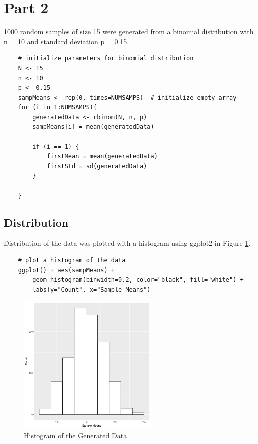 \documentclass{article}
\begin{document}
    \section{Part 2}
        1000 random samples of size 15 were generated from a binomial distribution with n = 10 and standard deviation p = 0.15.

\begin{lstlisting}
    # initialize parameters for binomial distribution
    N <- 15
    n <- 10
    p <- 0.15
    sampMeans <- rep(0, times=NUMSAMPS)  # initialize empty array
    for (i in 1:NUMSAMPS){
        generatedData <- rbinom(N, n, p)
        sampMeans[i] = mean(generatedData)

        if (i == 1) {
            firstMean = mean(generatedData)
            firstStd = sd(generatedData)
        }

    }
\end{lstlisting}

        

        \subsection{Distribution}
            Distribution of the data was plotted with a histogram using ggplot2 in Figure \ref{fig:hist2}.
\begin{lstlisting}
    # plot a histogram of the data
    ggplot() + aes(sampMeans) + 
        geom_histogram(binwidth=0.2, color="black", fill="white") +
        labs(y="Count", x="Sample Means")
\end{lstlisting}

            \begin{figure}[h]
                \begin{center}
                    \includegraphics[width=0.6\textwidth]{figures/hist2.png}
                    \caption{Histogram of the Generated Data} \label{fig:hist2}
                \end{center}
            \end{figure}
\end{document}
